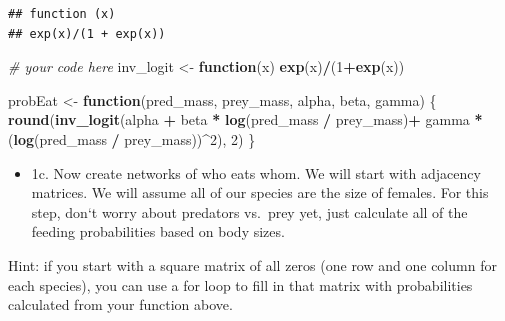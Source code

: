 \documentclass[
]{article}
\newenvironment{Shaded}{\begin{snugshade}}{\end{snugshade}}
\newcommand{\CommentTok}[1]{\textcolor[rgb]{0.56,0.35,0.01}{\textit{#1}}}
\newcommand{\ControlFlowTok}[1]{\textcolor[rgb]{0.13,0.29,0.53}{\textbf{#1}}}
\newcommand{\DecValTok}[1]{\textcolor[rgb]{0.00,0.00,0.81}{#1}}
\newcommand{\FunctionTok}[1]{\textcolor[rgb]{0.13,0.29,0.53}{\textbf{#1}}}
\newcommand{\NormalTok}[1]{#1}
\newcommand{\OtherTok}[1]{\textcolor[rgb]{0.56,0.35,0.01}{#1}}
\newcommand{\SpecialCharTok}[1]{\textcolor[rgb]{0.81,0.36,0.00}{\textbf{#1}}}
\providecommand{\tightlist}{%
  \setlength{\itemsep}{0pt}\setlength{\parskip}{0pt}}
\begin{document}
\begin{verbatim}
## function (x) 
## exp(x)/(1 + exp(x))
\end{verbatim}

\begin{Shaded}
\begin{Highlighting}[]
\CommentTok{\# your code here}
\NormalTok{inv\_logit }\OtherTok{\textless{}{-}} \ControlFlowTok{function}\NormalTok{(x) }\FunctionTok{exp}\NormalTok{(x)}\SpecialCharTok{/}\NormalTok{(}\DecValTok{1}\SpecialCharTok{+}\FunctionTok{exp}\NormalTok{(x))}

\NormalTok{probEat }\OtherTok{\textless{}{-}} \ControlFlowTok{function}\NormalTok{(pred\_mass, prey\_mass, alpha, beta, gamma) \{}
  \FunctionTok{round}\NormalTok{(}\FunctionTok{inv\_logit}\NormalTok{(alpha }\SpecialCharTok{+}\NormalTok{ beta }\SpecialCharTok{*} \FunctionTok{log}\NormalTok{(pred\_mass }\SpecialCharTok{/}\NormalTok{ prey\_mass)}\SpecialCharTok{+} 
\NormalTok{                    gamma }\SpecialCharTok{*}\NormalTok{ (}\FunctionTok{log}\NormalTok{(pred\_mass }\SpecialCharTok{/}\NormalTok{ prey\_mass))}\SpecialCharTok{\^{}}\DecValTok{2}\NormalTok{), }\DecValTok{2}\NormalTok{)}
\NormalTok{\}}
\end{Highlighting}
\end{Shaded}

\begin{itemize}
\tightlist
\item
  1c. Now create networks of who eats whom. We will start with adjacency
  matrices. We will assume all of our species are the size of females.
  For this step, don`t worry about predators vs.~prey yet, just
  calculate all of the feeding probabilities based on body sizes.
\end{itemize}

Hint: if you start with a square matrix of all zeros (one row and one
column for each species), you can use a for loop to fill in that matrix
with probabilities calculated from your function above.
\end{document}
